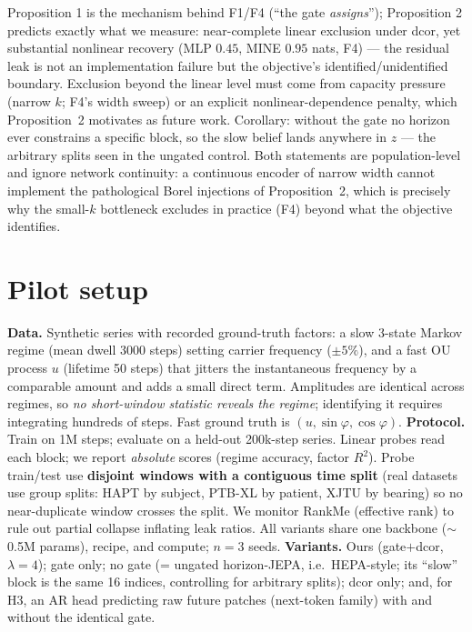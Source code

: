 \documentclass[10pt,twocolumn]{article}
\begin{document}
Proposition 1 is the mechanism behind F1/F4 (``the gate \emph{assigns}'');
Proposition 2 predicts exactly what we measure: near-complete linear
exclusion under dcor, yet substantial nonlinear recovery (MLP $0.45$, MINE
$0.95$ nats, F4) --- the residual leak is not an implementation failure but
the objective's identified/unidentified boundary. Exclusion beyond the
linear level must come from capacity pressure (narrow $k$; F4's width sweep)
or an explicit nonlinear-dependence penalty, which Proposition~2 motivates
as future work. Corollary: without the gate no horizon ever constrains a
specific block, so the slow belief lands anywhere in $z$ --- the arbitrary
splits seen in the ungated control. Both statements are population-level and
ignore network continuity: a continuous encoder of narrow width cannot
implement the pathological Borel injections of Proposition~2, which is
precisely why the small-$k$ bottleneck excludes in practice (F4) beyond what
the objective identifies.

\section{Pilot setup}
\textbf{Data.} Synthetic series with recorded ground-truth factors: a slow
3-state Markov regime (mean dwell 3000 steps) setting carrier frequency
($\pm5\%$), and a fast OU process $u$ (lifetime 50 steps) that jitters the
instantaneous frequency by a comparable amount and adds a small direct term.
Amplitudes are identical across regimes, so \emph{no short-window statistic
reveals the regime}; identifying it requires integrating hundreds of steps.
Fast ground truth is $(u,\sin\varphi,\cos\varphi)$.
\textbf{Protocol.} Train on 1M steps; evaluate on a held-out 200k-step series.
Linear probes read each block; we report \emph{absolute} scores (regime
accuracy, factor $R^2$). Probe train/test use \textbf{disjoint windows with a
contiguous time split} (real datasets use group splits: HAPT by subject,
PTB-XL by patient, XJTU by bearing) so no near-duplicate window crosses the
split. We monitor RankMe \cite{garrido2023rankme} (effective rank) to rule out partial collapse
inflating leak ratios. All variants share one backbone ($\sim$0.5M params),
recipe, and compute; $n{=}3$ seeds.
\textbf{Variants.} Ours (gate$+$dcor, $\lambda{=}4$); gate only; no gate
(= ungated horizon-JEPA, i.e.\ HEPA-style; its ``slow'' block is the same 16
indices, controlling for arbitrary splits); dcor only; and, for H3, an AR head
predicting raw future patches (next-token family) with and without the
identical gate.
\end{document}
